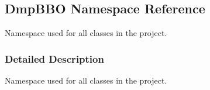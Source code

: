 \hypertarget{namespaceDmpBBO}{\subsection{Dmp\+B\+B\+O Namespace Reference}
\label{namespaceDmpBBO}
}


Namespace used for all classes in the project.  




\subsubsection{Detailed Description}
Namespace used for all classes in the project. 